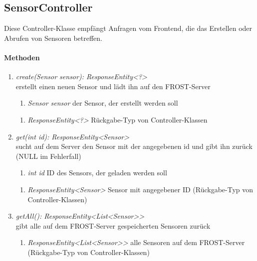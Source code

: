 \subsection*{SensorController}\label{sensCon}
Diese Controller-Klasse empfängt Anfragen vom Frontend, die das Erstellen oder Abrufen von Sensoren betreffen.

\paragraph{Methoden}

\begin{enumerate}[+]
	\item \textit{ create(Sensor sensor): ResponseEntity<?> }\\
	erstellt einen neuen Sensor und lädt ihn auf den FROST-Server
	
	\begin{enumerate}[$\bullet$]
		\item \textit{Sensor sensor} der Sensor, der erstellt werden soll
		
	\end{enumerate}
	\vspace{-0.2cm}
	\begin{enumerate}[$\circ$]
		\item \textit{ResponseEntity<?>} Rückgabe-Typ von Controller-Klassen
	\end{enumerate}
	
	\item \textit{ get(int id): ResponseEntity<Sensor> }\\
	sucht auf dem Server den Sensor mit der angegebenen id und gibt ihn zurück (NULL im Fehlerfall)
	
	\begin{enumerate}[$\bullet$]
		\item \textit{int id} ID des Sensors, der geladen werden soll
		
	\end{enumerate}
	\vspace{-0.2cm}
	\begin{enumerate}[$\circ$]
		\item \textit{ResponseEntity<Sensor>} Sensor mit angegebener ID (Rückgabe-Typ von Controller-Klassen)
	\end{enumerate}
	\item \textit{ getAll(): ResponseEntity<List<Sensor>> }\\
	gibt alle auf dem FROST-Server gespeicherten Sensoren zurück
	
	\begin{enumerate}[$\circ$]
		\item \textit{ResponseEntity<List<Sensor>>} alle Sensoren auf dem FROST-Server (Rückgabe-Typ von Controller-Klassen)
	\end{enumerate}
	
	
\end{enumerate}